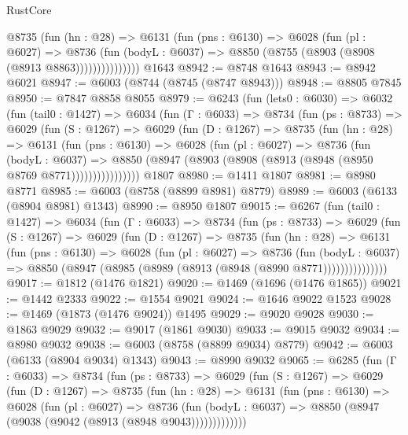 \begin{lexlean}{RustCore}
\begin{coremodule}
                @8735
                  (fun (hn : @28) =>
                  @6131
                    (fun (pns : @6130) =>
                    @6028
                      (fun (pl : @6027) =>
                      @8736
                        (fun (bodyL : @6037) =>
                        @8850 (@8755 (@8903 (@8908 (@8913 @8863)))))))))))))))
    @1643
@8942 := @8748 @1643
@8943 := @8942 @6021
@8947 := @6003 (@8744 (@8745 (@8747 @8943)))
@8948 := @8805 @7845
@8950 := @7847 @8858 @8055
@8979 := @6243
    (fun (lets0 : @6030) =>
    @6032
      (fun (tail0 : @1427) =>
      @6034
        (fun (Γ : @6033) =>
        @8734
          (fun (ps : @8733) =>
          @6029
            (fun (S : @1267) =>
            @6029
              (fun (D : @1267) =>
              @8735
                (fun (hn : @28) =>
                @6131
                  (fun (pns : @6130) =>
                  @6028
                    (fun (pl : @6027) =>
                    @8736
                      (fun (bodyL : @6037) =>
                      @8850 (@8947 (@8903 (@8908 (@8913 (@8948 (@8950 @8769 @8771))))))))))))))))
    @1807
@8980 := @1411 @1807
@8981 := @8980 @8771
@8985 := @6003 (@8758 (@8899 @8981) @8779)
@8989 := @6003 (@6133 (@8904 @8981) @1343)
@8990 := @8950 @1807
@9015 := @6267
    (fun (tail0 : @1427) =>
    @6034
      (fun (Γ : @6033) =>
      @8734
        (fun (ps : @8733) =>
        @6029
          (fun (S : @1267) =>
          @6029
            (fun (D : @1267) =>
            @8735
              (fun (hn : @28) =>
              @6131
                (fun (pns : @6130) =>
                @6028
                  (fun (pl : @6027) =>
                  @8736
                    (fun (bodyL : @6037) =>
                    @8850 (@8947 (@8985 (@8989 (@8913 (@8948 (@8990 @8771)))))))))))))))
@9017 := @1812 (@1476 @1821)
@9020 := @1469 (@1696 (@1476 @1865))
@9021 := @1442 @2333
@9022 := @1554 @9021
@9024 := @1646 @9022 @1523
@9028 := @1469 (@1873 (@1476 @9024)) @1495
@9029 := @9020 @9028
@9030 := @1863 @9029
@9032 := @9017 (@1861 @9030)
@9033 := @9015 @9032
@9034 := @8980 @9032
@9038 := @6003 (@8758 (@8899 @9034) @8779)
@9042 := @6003 (@6133 (@8904 @9034) @1343)
@9043 := @8990 @9032
@9065 := @6285
    (fun (Γ : @6033) =>
    @8734
      (fun (ps : @8733) =>
      @6029
        (fun (S : @1267) =>
        @6029
          (fun (D : @1267) =>
          @8735
            (fun (hn : @28) =>
            @6131
              (fun (pns : @6130) =>
              @6028
                (fun (pl : @6027) =>
                @8736
                  (fun (bodyL : @6037) =>
                  @8850 (@8947 (@9038 (@9042 (@8913 (@8948 @9043)))))))))))))

\end{coremodule}
\end{lexlean}
